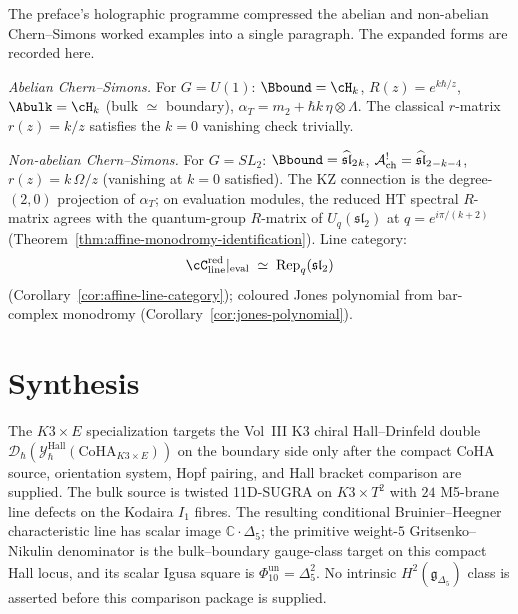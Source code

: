 \begin{remark}
\label{rem:moved-preface-abelian-nonabelian-cs}
The preface's holographic programme compressed the abelian and non-abelian Chern--Simons worked examples into a single paragraph. The expanded forms are recorded here.

\smallskip
\noindent\emph{Abelian Chern--Simons.}
For $G = U(1)$: $\Bbound = \cH_k$, $R(z) = e^{k\hbar/z}$, $\Abulk = \cH_k$ (bulk $\simeq$ boundary), $\alpha_T = m_2 + \hbar k\,\eta \otimes \Lambda$. The classical $r$-matrix $r(z) = k/z$ satisfies the $k = 0$ vanishing check trivially.

\smallskip
\noindent\emph{Non-abelian Chern--Simons.}
For $G = SL_2$: $\Bbound = \widehat{\mathfrak{sl}}_2{}_k$, $\mathcal{A}^!_{\mathrm{ch}} = \widehat{\mathfrak{sl}}_2{}_{-k-4}$, $r(z) = k\,\Omega/z$ (vanishing at $k = 0$ satisfied). The KZ connection is the degree-$(2,0)$ projection of $\alpha_T$; on evaluation modules, the reduced HT spectral $R$-matrix agrees with the quantum-group $R$-matrix of $U_q(\mathfrak{sl}_2)$ at $q = e^{i\pi/(k+2)}$ (Theorem~\ref{thm:affine-monodromy-identification}). Line category:
\[
\cC_{\mathrm{line}}^{\mathrm{red}}|_{\mathrm{eval}}
\;\simeq\;
\operatorname{Rep}_q(\mathfrak{sl}_2)
\]
(Corollary~\ref{cor:affine-line-category}); coloured Jones polynomial from bar-complex monodromy (Corollary~\ref{cor:jones-polynomial}).
\end{remark}

\section{Synthesis}
\label{sec:htbb-core-supplement}

\begin{remark}
\label{rem:htbb-core-hall-drinfeld}
The $K3 \times E$ specialization targets the Vol~III K3 chiral
Hall--Drinfeld double
$\mathcal{D}_\hbar(\mathcal{Y}^{\mathrm{Hall}}_\hbar(\mathrm{CoHA}_{K3 \times E}))$
on the boundary side only after the compact CoHA source, orientation
system, Hopf pairing, and Hall bracket comparison are supplied. The
bulk source is twisted 11D-SUGRA on $K3 \times T^2$ with $24$
M5-brane line defects on the Kodaira $I_1$ fibres. The resulting
conditional Bruinier--Heegner characteristic line has scalar image
\(\mathbb C\cdot\Delta_5\); the primitive weight-$5$
Gritsenko--Nikulin denominator is the bulk--boundary gauge-class target on
this compact Hall locus, and its scalar Igusa square is
$\Phi_{10}^{\mathrm{un}}=\Delta_5^2$. No intrinsic
\(H^2(\mathfrak g_{\Delta_5})\) class is asserted before this comparison
package is supplied.
\end{remark}

